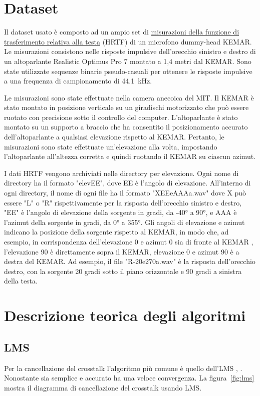 \documentclass[12pt,a4paper,titlepage]{article}
\begin{document}
\section{Dataset}
\label{sec:Dataset}
Il dataset usato è composto ad un ampio set di \href{http://sound.media.mit.edu/resources/KEMAR/full.zip}{misurazioni della funzione di trasferimento relativa alla testa} (HRTF) di un microfono dummy-head KEMAR. Le misurazioni consistono nelle risposte impulsive dell'orecchio sinistro e destro di un altoparlante Realistic Optimus Pro 7 montato a 1,4 metri dal KEMAR. Sono state utilizzate sequenze binarie pseudo-casuali per ottenere le risposte impulsive a una frequenza di campionamento di \SI{44.1}{\kilo \hertz}. \cite{Gardner:HRTF}

Le misurazioni sono state effettuate nella camera anecoica del MIT. Il KEMAR è stato montato in posizione verticale su un giradischi motorizzato che può essere ruotato con precisione sotto il controllo del computer. L'altoparlante è stato montato su un supporto a braccio che ha consentito il posizionamento accurato dell'altoparlante a qualsiasi elevazione rispetto al KEMAR. Pertanto, le misurazioni sono state effettuate un'elevazione alla volta, impostando l'altoparlante all'altezza corretta e quindi ruotando il KEMAR su ciascun azimut.

I dati HRTF vengono archiviati nelle directory per elevazione. Ogni nome di directory ha il formato "elevEE", dove EE è l'angolo di elevazione. All'interno di ogni directory, il nome di ogni file ha il formato "XEEeAAAa.wav" dove X può essere "L" o "R" rispettivamente per la risposta dell'orecchio sinistro e destro, "EE" è l'angolo di elevazione della sorgente in gradi, da -40° a 90°, e AAA è l'azimut della sorgente in gradi, da 0° a 355°. Gli angoli di elevazione e azimut indicano la posizione della sorgente rispetto al KEMAR, in modo che, ad esempio, in corrispondenza dell'elevazione 0 e azimut 0 sia di fronte al KEMAR , l'elevazione 90 è direttamente sopra il KEMAR, elevazione 0 e azimut 90 è a destra del KEMAR. Ad esempio, il file "R-20e270a.wav" è la risposta dell'orecchio destro, con la sorgente 20 gradi sotto il piano orizzontale e 90 gradi a sinistra della testa.
\clearpage
\section{Descrizione teorica degli algoritmi}
\label{sec:descrizione_teorica}
\subsection{LMS}
\label{subsec:LMS_teoria}
Per la cancellazione del crosstalk l'algoritmo più comune è quello dell'LMS \cite{143434}, \cite{4217047}.
Nonostante sia semplice e accurato ha una veloce convergenza. La figura~\ref{fig:lms} mostra il diagramma di cancellazione del crosstalk usando LMS. 
\end{document}

